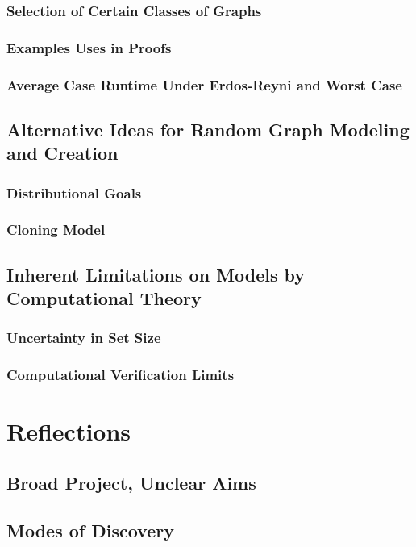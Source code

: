 \documentclass[11pt,a4paper]{report}
\begin{document}
\subsection{Selection of Certain Classes of Graphs}
\subsection{Examples Uses in Proofs}
\subsection{Average Case Runtime Under Erdos-Reyni and Worst Case}

\section{Alternative Ideas for Random Graph Modeling and Creation}
\subsection{Distributional Goals}
\subsection{Cloning Model}

\section{Inherent Limitations on Models by Computational Theory}
\subsection{Uncertainty in Set Size}
\subsection{Computational Verification Limits}



\chapter{Reflections}
\section{Broad Project, Unclear Aims}
\section{Modes of Discovery}
\end{document}
